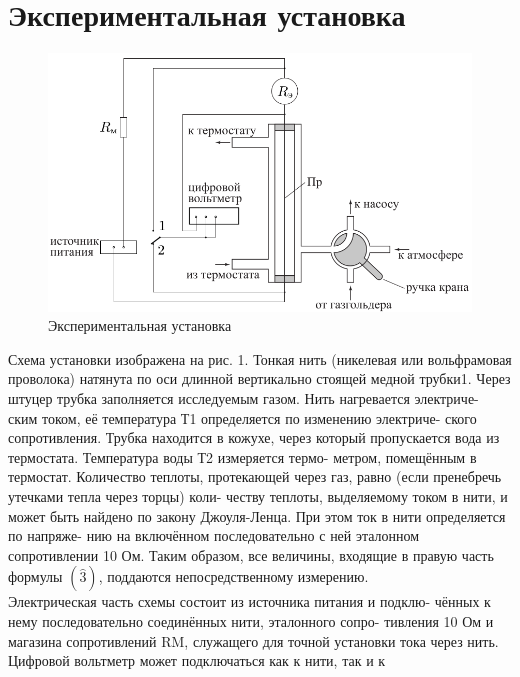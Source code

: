\documentclass[a4paper, 10pt, twocolumn]{article}
\begin{document}
\section{Экспериментальная установка}
    \begin{figure}[H]
        \includegraphics[width=1\linewidth]{images/installation.png}
        \begin{center}
            \caption{Экспериментальная установка}
        \end{center}
    \end{figure}
    Схема установки изображена на рис. 1. Тонкая нить (никелевая или 
    вольфрамовая проволока) натянута по оси длинной вертикально стоящей медной трубки1. Через штуцер
     трубка заполняется исследуемым газом. Нить нагревается электриче- ским током, её температура Т1
     определяется по изменению электриче- ского сопротивления. Трубка находится в кожухе, через 
    который пропускается вода из термостата. Температура воды Т2 измеряется термо- метром, помещённым
     в термостат. Количество теплоты, протекающей через газ, равно (если пренебречь утечками тепла 
     через торцы) коли- честву теплоты, выделяемому током в нити, и может быть найдено по закону 
    Джоуля-Ленца. При этом ток в нити определяется по напряже- нию на включённом последовательно с 
    ней эталонном сопротивлении 10 Ом. Таким образом, все величины, входящие в правую часть формулы 
    $(\widehat{3})$, поддаются непосредственному измерению.
    \\ \newline
    Электрическая часть схемы состоит из источника питания и подклю- чённых к нему последовательно 
    соединённых нити, эталонного сопро- тивления 10 Ом и магазина сопротивлений RM, служащего для 
    точной установки тока через нить. Цифровой вольтметр может подключаться как к нити, так и к 
\end{document}
